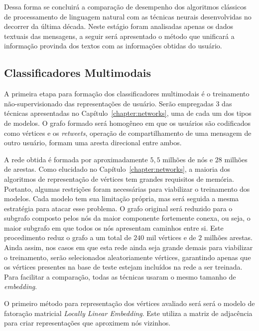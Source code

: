 Dessa forma se concluirá a comparação de desempenho dos algoritmos clássicos
de processamento de linguagem natural com as técnicas neurais desenvolvidas no
decorrer da última década.
Neste estágio foram analisadas apenas os dados textuais das mensagens, a seguir
será apresentado o método que unificará a informação provinda dos textos com as
informações obtidas do usuário.

\subsection{Classificadores Multimodais}
\label{sec:multimodal-classifier}


A primeira etapa para formação dos classificadores multimodais é o treinamento
não-supervisionado das representações de usuário.
Serão empregadas 3 das técnicas apresentadas no Capítulo~\ref{chapter:networks},
uma de cada um dos tipos de modelos.
O grafo formado será homogêneo em que os usuários são codificados como vértices
e os \textit{retweets}, operação de compartilhamento de uma mensagem de outro
usuário, formam uma aresta direcional entre ambos.

A rede obtida é formada por aproximadamente $5,5$ milhões de nós e $28$ milhões
de arestas.
Como elucidado no Capítulo~\ref{chapter:networks}, a maioria dos algoritmos de
representação de vértices tem grandes requisitos de memória.
Portanto, algumas restrições foram necessárias para viabilizar o treinamento dos
modelos.
Cada modelo tem sua limitação própria, mas será seguida a mesma estratégia para
atacar esse problema.
O grafo original será reduzido para o subgrafo composto pelos nós da maior
componente fortemente conexa, ou seja, o maior subgrafo em que todos os nós
apresentam caminhos entre si.
Este procedimento reduz o grafo a um total de $240$ mil vértices e de $2$ milhões
arestas.
Ainda assim, nos casos em que esta rede ainda seja grande demais para viabilizar
o treinamento, serão selecionados aleatoriamente vértices, garantindo apenas que
os vértices presentes na base de teste estejam incluídos na rede a ser treinada.
Para facilitar a comparação, todas as técnicas usaram o mesmo tamanho de
\textit{embedding}.

O primeiro método para representação dos vértices avaliado será será o modelo de
fatoração matricial \textit{Locally Linear Embedding}.
Este utiliza a matriz de adjacência para criar representações que aproximem nós
vizinhos.

